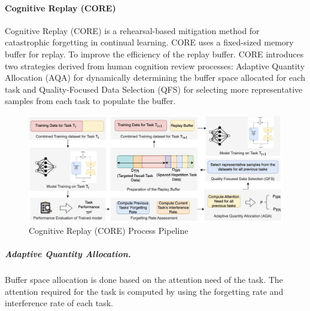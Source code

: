 \paragraph{Cognitive Replay (CORE)} \label{Core}
Cognitive Replay (CORE) \cite{zhang2024core} is a rehearsal-based mitigation method for catastrophic forgetting in continual learning. CORE uses a fixed-sized memory buffer for replay. To improve the efficiency of the replay buffer. CORE introduces two strategies derived from human cognition review processes: Adaptive Quantity Allocation (AQA) for dynamically determining the buffer space allocated for each task and Quality-Focused Data Selection (QFS) for selecting more representative samples from each task to populate the buffer. 
\begin{figure}[h]
    \centering
    \includegraphics[width=1\textwidth]{Figures/literature_review/core_replay_process.jpeg} 
    \caption{Cognitive Replay (CORE) Process Pipeline}
    \label{fig:CoreReplay}
\end{figure}
\subparagraph{Adaptive Quantity Allocation.} \label{AQA} Buffer space allocation is done based on the attention need of the task. The attention required for the task is computed by using the forgetting rate and interference rate of each task.
